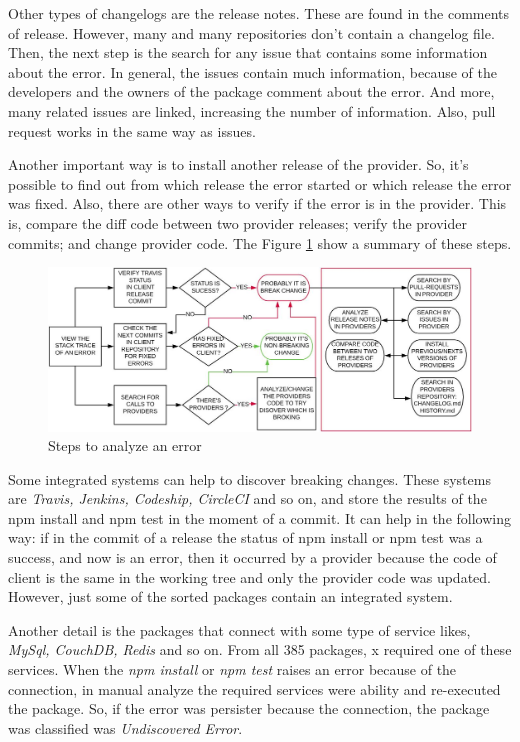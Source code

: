 Other types of changelogs are the release notes. These are found in the comments of release. However, many and many repositories don’t contain a changelog file. Then, the next step is the search for any issue that contains some information about the error. In general, the issues contain much information, because of the developers and the owners of the package comment about the error. And more, many related issues are linked, increasing the number of information. Also, pull request works in the same way as issues.

Another important way is to install another release of the provider. So, it's possible to find out from which release the error started or which release the error was fixed. Also, there are other ways to verify if the error is in the provider. This is, compare the diff code between two provider releases; verify the provider commits; and change provider code.
The Figure \ref{fig:step_analyze} show a summary of these steps.

\begin{figure}
    \centering
    \includegraphics[scale=0.35]{figuras/step_analyze.jpeg}
    \caption{Steps to analyze an error}
    \label{fig:step_analyze}
\end{figure}
Some integrated systems can help to discover breaking changes. These systems are \textit{Travis, Jenkins, Codeship, CircleCI} and so on, and store the results of the npm install and npm test in the moment of a commit. It can help in the following way: if in the commit of a release the status of npm install or npm test was a success, and now is an error, then it occurred by a provider because the code of client is the same in the working tree and only the provider code was updated. However, just some of the sorted packages contain an integrated system.

Another detail is the packages that connect with some type of service likes, \textit{MySql, CouchDB, Redis} and so on. From all 385 packages, x required one of these services. When the \textit{npm install} or \textit{npm test} raises an error because of the connection, in manual analyze the required services were ability and re-executed the package. So, if the error was persister because the connection, the package was classified was \textit{Undiscovered Error}.

